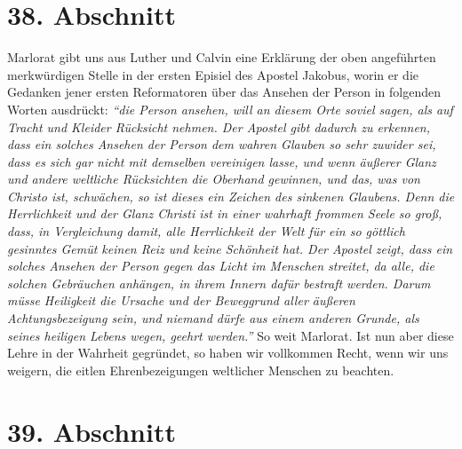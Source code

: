 \section{38. Abschnitt} \label{kap9_ab38}

Marlorat gibt uns
aus Luther und Calvin eine
Erklärung der oben
angeführten
merkwürdigen Stelle in der ersten Episiel des Apostel Jakobus, worin er die
Gedanken jener ersten Reformatoren über das Ansehen der Person in folgenden
Worten ausdrückt:
\textit{"`die Person ansehen, will an diesem Orte soviel sagen, als
auf Tracht und Kleider Rücksicht nehmen. Der Apostel gibt dadurch zu erkennen,
dass ein solches Ansehen der Person dem wahren Glauben so sehr zuwider sei, dass
es sich gar nicht mit demselben vereinigen lasse, und wenn äußerer Glanz und
andere weltliche Rücksichten die Oberhand gewinnen, und das, was von Christo
ist, schwächen, so ist dieses ein Zeichen des sinkenen Glaubens. Denn die
Herrlichkeit und der Glanz Christi ist in einer wahrhaft frommen Seele so groß,
dass, in Vergleichung damit, alle Herrlichkeit der Welt für ein so göttlich
gesinntes Gemüt keinen Reiz und keine Schönheit hat. Der Apostel zeigt, dass
ein
solches Ansehen der Person gegen das Licht im Menschen streitet, da alle, die
solchen Gebräuchen anhängen, in ihrem Innern dafür bestraft werden. Darum
müsse Heiligkeit die Ursache und der Beweggrund aller äußeren Achtungsbezeigung
sein, und niemand dürfe aus einem anderen Grunde, als seines heiligen Lebens
wegen, geehrt werden."'} So weit Marlorat. Ist nun aber diese Lehre in der
Wahrheit gegründet, so haben wir vollkommen Recht, wenn wir uns weigern, die
eitlen Ehrenbezeigungen weltlicher Menschen zu beachten.

\section{39. Abschnitt} \label{kap9_ab39}

